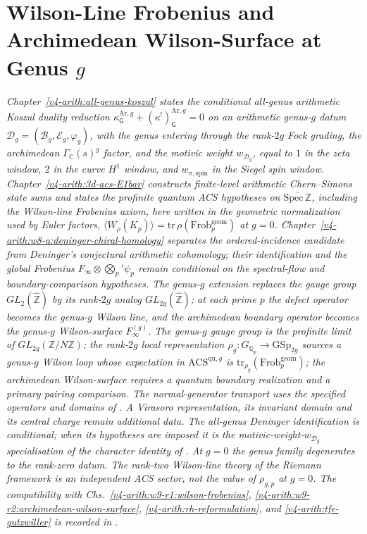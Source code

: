 \chapter{Wilson-Line Frobenius and Archimedean Wilson-Surface at Genus \(g\)}
\label{v4-arith:w9-r6:chapter}

\emph{Chapter~\ref{v4-arith:all-genus-koszul} states the conditional
all-genus arithmetic Koszul duality reduction
\(\kappa^{\mathrm{Ar},g}_{\mathsf{G}}+(\kappa^{!})^{\mathrm{Ar},g}_{\mathsf{G}}=0\)
on an arithmetic genus-\(g\) datum
\(\mathcal{D}_{g}=(\mathcal{B}_{g},\mathcal{E}_{g},\varphi_{g})\), with
the genus entering through the rank-\(2g\) Fock grading, the archimedean
\(\Gamma_{\mathbb{C}}(s)^{g}\) factor, and the motivic weight
\(w_{\mathcal{D}_{g}}\), equal to \(1\) in the zeta window, \(2\) in the
curve \(H^{1}\) window, and \(w_{\pi,\mathrm{spin}}\) in the Siegel spin
window. Chapter~\ref{v4-arith:3d-acs-E1bar}
constructs finite-level arithmetic Chern--Simons state sums and states
the profinite quantum ACS hypotheses on
\(\overline{\mathrm{Spec}\,\mathbb{Z}}\), including the Wilson-line
Frobenius axiom, here written in the geometric normalization used by
Euler factors,
\(\langle W_{\rho}(K_{p})\rangle=\mathrm{tr}\,\rho(\mathrm{Frob}_{p}^{\mathrm{geom}})\)
at \(g=0\). Chapter~\ref{v4-arith:w8-a:deninger-chiral-homology}
separates the ordered-incidence candidate from Deninger's conjectural
arithmetic cohomology; their identification and the global Frobenius
\(F_{\infty}\otimes\bigotimes_{p}'\psi_{p}\) remain conditional on the
spectral-flow and boundary-comparison hypotheses. The genus-\(g\)
extension replaces the gauge group
\(GL_{2}(\widehat{\mathbb{Z}})\) by its rank-\(2g\) analog
\(GL_{2g}(\widehat{\mathbb{Z}})\); at each prime \(p\) the defect
operator becomes the genus-\(g\) Wilson line, and the archimedean boundary
operator becomes the genus-\(g\) Wilson-surface \(F^{(g)}_{\infty}\). The genus-\(g\) gauge group is the profinite limit of
\(GL_{2g}(\mathbb{Z}/N\mathbb{Z})\); the rank-\(2g\) local representation
\(\rho_{g}:G_{\mathbb{Q}_{p}}\to\mathrm{GSp}_{2g}\) sources a genus-\(g\)
Wilson loop whose expectation in
\(\mathrm{ACS}^{\mathrm{qu},g}\) is
\(\mathrm{tr}_{\rho_{g}}(\mathrm{Frob}_{p}^{\mathrm{geom}})\); the archimedean
Wilson-surface requires a quantum boundary realization and a
primary pairing comparison. The normal-generator transport uses the
specified operators and domains of
. A Virasoro representation,
its invariant domain and its central charge remain additional data.
The all-genus Deninger
identification is conditional; when its hypotheses are imposed it is
the motivic-weight-\(w_{\mathcal{D}_{g}}\) specialisation of the
character identity of
. At \(g=0\) the genus
family degenerates to the rank-zero datum. The rank-two Wilson-line
theory of the Riemann framework is an independent ACS sector, not the
value of \(\rho_{g,p}\) at \(g=0\). The compatibility with
Chs.~\ref{v4-arith:w9-r1:wilson-frobenius},
\ref{v4-arith:w9-r2:archimedean-wilson-surface},
\ref{v4-arith:rh-reformulation}, and \ref{v4-arith:tfe-gutzwiller} is
recorded in .}


